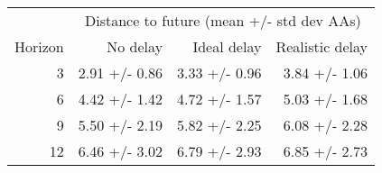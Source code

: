 
\begin{tabular*}{0.7\textwidth}{rrrr}
\toprule
          & \multicolumn{3}{c}{Distance to future (mean +/- std dev AAs)} \\
  Horizon & No delay & Ideal delay & Realistic delay \\
\midrule

3 & 2.91 +/- 0.86 & 3.33 +/- 0.96 & 3.84 +/- 1.06 \\
6 & 4.42 +/- 1.42 & 4.72 +/- 1.57 & 5.03 +/- 1.68 \\
9 & 5.50 +/- 2.19 & 5.82 +/- 2.25 & 6.08 +/- 2.28 \\
12 & 6.46 +/- 3.02 & 6.79 +/- 2.93 & 6.85 +/- 2.73 \\

\bottomrule
\end{tabular*}

